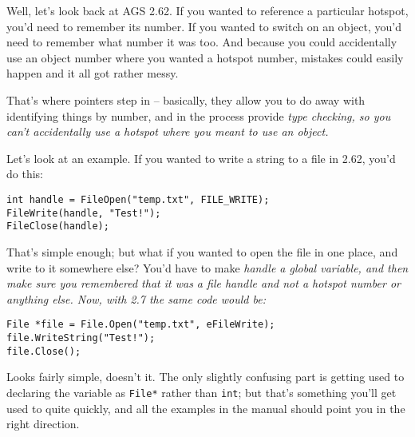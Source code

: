 Well, let's look back at AGS 2.62. If you wanted to reference a particular hotspot,
you'd need to remember its number. If you wanted to switch on an object, you'd need to
remember what number it was too. And because you could accidentally use an object
number where you wanted a hotspot number, mistakes could easily happen and it all got
rather messy.

That's where pointers step in -- basically, they allow you to do away with identifying
things by number, and in the process provide \it{type checking}, so you can't accidentally
use a hotspot where you meant to use an object.

Let's look at an example. If you wanted to write a string to a file in 2.62, you'd do this:
\begin{verbatim}
int handle = FileOpen("temp.txt", FILE_WRITE);
FileWrite(handle, "Test!");
FileClose(handle);
\end{verbatim}
That's simple enough; but what if you wanted to open the file in one place, and write
to it somewhere else? You'd have to make \it{handle} a global variable, and then make
sure you remembered that it was a file handle and not a hotspot number or anything else.
Now, with 2.7 the same code would be:
\begin{verbatim}
File *file = File.Open("temp.txt", eFileWrite);
file.WriteString("Test!");
file.Close();
\end{verbatim}
Looks fairly simple, doesn't it. The only slightly confusing part is getting used
to declaring the variable as \verb$File*$ rather than \verb$int$; but that's something
you'll get used to quite quickly, and all the examples in the manual should point
you in the right direction.

